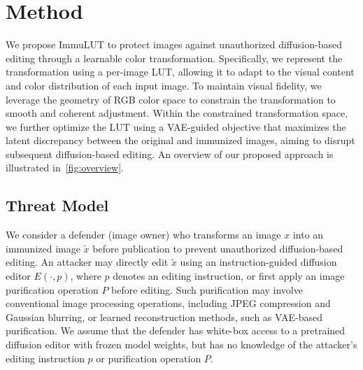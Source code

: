 \section{Method}
\label{sec:method}
We propose ImmuLUT to protect images against unauthorized diffusion-based editing through a learnable color transformation. Specifically, we represent the transformation using a per-image LUT, allowing it to adapt to the visual content and color distribution of each input image. To maintain visual fidelity, we leverage the geometry of RGB color space to constrain the transformation to smooth and coherent adjustment. Within the constrained transformation space, we further optimize the LUT using a VAE-guided objective that maximizes the latent discrepancy between the original and immunized images, aiming to disrupt subsequent diffusion-based editing. An overview of our proposed approach is illustrated in~\cref{fig:overview}.



\subsection{Threat Model}
\label{sec:threat}
We consider a defender (image owner) who transforms an image $x$ into an immunized image $\tilde{x}$ before publication to prevent unauthorized diffusion-based editing. An attacker may directly edit $\tilde{x}$ using an instruction-guided diffusion editor $E(\cdot,p)$, where $p$ denotes an editing instruction, or first apply an image purification operation $P$ before editing. Such purification may involve conventional image processing operations, including JPEG compression and Gaussian blurring, or learned reconstruction methods, such as VAE-based purification. We assume that the defender has white-box access to a pretrained diffusion editor with frozen model weights, but has no knowledge of the attacker's editing instruction \(p\) or purification operation \(P\). 


